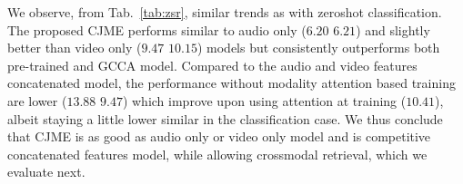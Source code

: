 \begin{table}
\centering
{}
\caption{Zeroshot retrieval performances (\% mAP) achieved by models when audio only, video only, and both audio and video modalities are used for training and test. Note that the audio and video concatenation based model requires both modalities at test time also and can not predict using any single one.}
\label{tab:zsr}
\vspace{-1em}
\end{table}
We observe, from Tab.~\ref{tab:zsr}, similar trends as with zeroshot classification. The proposed CJME performs similar to audio only ($6.20$ \vs $6.21$) and slightly better than video only ($9.47$ \vs $10.15$) models but consistently outperforms both pre-trained and GCCA model. Compared to the audio and video features concatenated model, the performance without modality attention based training are lower ($13.88$ \vs $9.47$) which improve upon using attention at training ($10.41$), albeit staying a little lower \cf similar in the classification case. We thus conclude that CJME is as good as audio only or video only model and is competitive \cf concatenated features model, while allowing crossmodal retrieval, which we evaluate next.
